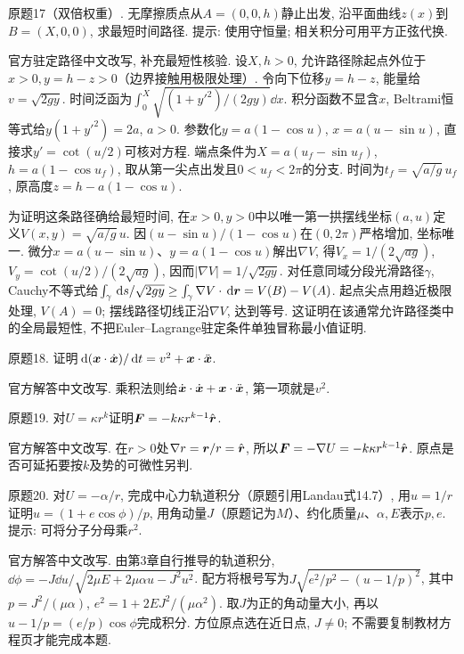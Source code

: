 \begin{exercise}
原题17（双倍权重）. 无摩擦质点从$A=(0,0,h)$静止出发, 沿平面曲线$z(x)$到$B=(X,0,0)$, 求最短时间路径. 提示: 使用守恒量; 相关积分可用平方正弦代换.
\end{exercise}
\begin{solution}
官方驻定路径中文改写, 补充最短性核验. 设$X,h>0$, 允许路径除起点外位于$x>0,y=h-z>0$（边界接触用极限处理）. 令向下位移$y=h-z$, 能量给$v=\sqrt{2gy}$. 时间泛函为$\int_0^X\sqrt{(1+y'^2)/(2gy)}\dd x$. 积分函数不显含$x$, Beltrami恒等式给$y(1+y'^2)=2a$, $a>0$. 参数化$y=a(1-\cos u)$, $x=a(u-\sin u)$, 直接求$y'=\cot(u/2)$可核对方程. 端点条件为$X=a(u_f-\sin u_f)$, $h=a(1-\cos u_f)$, 取从第一尖点出发且$0<u_f<2\pi$的分支. 时间为$t_f=\sqrt{a/g}\,u_f$, 原高度$z=h-a(1-\cos u)$.

为证明这条路径确给最短时间, 在$x>0,y>0$中以唯一第一拱摆线坐标$(a,u)$定义$V(x,y)=\sqrt{a/g}\,u$. 因$(u-\sin u)/(1-\cos u)$在$(0,2\pi)$严格增加, 坐标唯一. 微分$x=a(u-\sin u)$、$y=a(1-\cos u)$解出$\nabla V$, 得$V_x=1/(2\sqrt{ag})$, $V_y=\cot(u/2)/(2\sqrt{ag})$, 因而$|\nabla V|=1/\sqrt{2gy}$. 对任意同域分段光滑路径$\gamma$, Cauchy不等式给$\int_\gamma\,\mathrm d s/\sqrt{2gy}\ge\int_\gamma\nabla V\cdot\,\mathrm d\boldsymbol{r}=V(B)-V(A)$. 起点尖点用趋近极限处理, $V(A)=0$; 摆线路径切线正沿$\nabla V$, 达到等号. 这证明在该通常允许路径类中的全局最短性, 不把Euler--Lagrange驻定条件单独冒称最小值证明.
\end{solution}

\begin{exercise}
原题18. 证明$\,\mathrm d(\boldsymbol{x}\cdot\dot{\boldsymbol{x}})/\,\mathrm d t=v^2+\boldsymbol{x}\cdot\ddot{\boldsymbol{x}}$.
\end{exercise}
\begin{solution}
官方解答中文改写. 乘积法则给$\dot{\boldsymbol{x}}\cdot\dot{\boldsymbol{x}}+\boldsymbol{x}\cdot\ddot{\boldsymbol{x}}$, 第一项就是$v^2$.
\end{solution}

\begin{exercise}
原题19. 对$U=\kappa r^k$证明$\boldsymbol{F}=-k\kappa r^{k-1}\hat{\boldsymbol{r}}$.
\end{exercise}
\begin{solution}
官方解答中文改写. 在$r>0$处$\nabla r=\boldsymbol{r}/r=\hat{\boldsymbol{r}}$, 所以$\boldsymbol{F}=-\nabla U=-k\kappa r^{k-1}\hat{\boldsymbol{r}}$. 原点是否可延拓要按$k$及势的可微性另判.
\end{solution}

\begin{exercise}
原题20. 对$U=-\alpha/r$, 完成中心力轨道积分（原题引用Landau式14.7）, 用$u=1/r$证明$u=(1+e\cos\phi)/p$, 用角动量$J$（原题记为$M$）、约化质量$\mu$、$\alpha,E$表示$p,e$. 提示: 可将分子分母乘$r^2$.
\end{exercise}
\begin{solution}
官方解答中文改写. 由第3章自行推导的轨道积分, $\dd\phi=-J\dd u/\sqrt{2\mu E+2\mu\alpha u-J^2u^2}$. 配方将根号写为$J\sqrt{e^2/p^2-(u-1/p)^2}$, 其中$p=J^2/(\mu\alpha)$, $e^2=1+2EJ^2/(\mu\alpha^2)$. 取$J$为正的角动量大小, 再以$u-1/p=(e/p)\cos\phi$完成积分. 方位原点选在近日点, $J\ne0$; 不需要复制教材方程页才能完成本题.
\end{solution}

